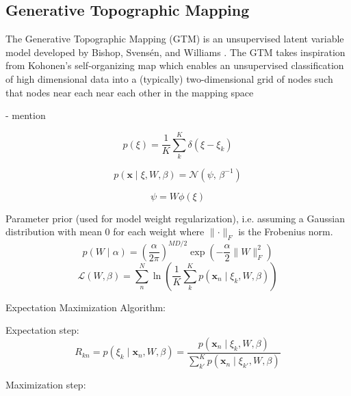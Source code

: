 \documentclass[remotesensing,article,submit,pdftex,moreauthors]{Definitions/mdpi}
\begin{document}
\subsection{Generative Topographic Mapping}

The Generative Topographic Mapping (GTM) is an unsupervised latent variable model developed by Bishop, Svens\'en, and Williams \cite{gtm-bishop-1}. The GTM takes inspiration from Kohonen's self-organizing map which enables an unsupervised classification of high dimensional data into a (typically) two-dimensional grid of nodes such that nodes near each near each other in the mapping space

- mention 

\begin{equation}\label{eq:latent-prob}
    p(\xi) = \frac{1}{K}\sum_k^K \delta(\xi - \xi_k)
\end{equation}

\begin{equation}\label{eq:data-prob}
    p\left( \mathbf{x} \mid \xi, W, \beta \right)  = \mathcal{N}(\psi,\, \beta^{-1})
\end{equation}

\begin{equation}\label{eq:psi}
    \psi = W\phi(\xi)
\end{equation}

Parameter prior (used for model weight regularization), i.e. assuming a Gaussian distribution with mean 0 for each weight where $\lVert \cdot \rVert_{F}$ is the Frobenius norm.
\begin{equation}\label{eq:weight-prior}
    p(W \mid \alpha) =  \left( \frac{\alpha}{2\pi} \right)^{MD/2}\exp\left(-\frac{\alpha}{2}\lVert W \rVert_{F}^2\right)
\end{equation}
\begin{equation}\label{eq:llh}
    \mathcal{L}(W, \beta) = \sum_n^N \ln \left(\dfrac{1}{K}\sum_k^K p(\mathbf{x}_n \mid \xi_k, W, \beta) \right)
\end{equation}

Expectation Maximization Algorithm:

Expectation step:
\begin{equation}\label{eq:responsibility}
    R_{kn} = p(\xi_k \mid \mathbf{x}_n, W, \beta) = \dfrac{p(\mathbf{x}_n \mid \xi_k, W, \beta)}{\sum\limits_{k'}^{K} p(\mathbf{x}_n \mid \xi_{k'}, W, \beta)}
\end{equation}

Maximization step:
\end{document}
